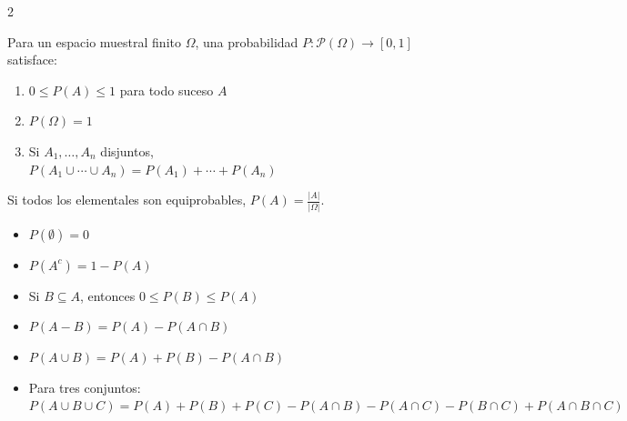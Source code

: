 \documentclass[10pt,a4paper]{article}
\begin{document}
\begin{multicols}{2}
    \begin{tcolorbox}[title=Definición, equal height group=PROB1]
        Para un espacio muestral finito \(\Omega\), una probabilidad \(P: \mathcal{P}(\Omega) \to [0,1]\) satisface:
        \begin{enumerate}[topsep=0pt]
            \item \(0 \leq P(A) \leq 1\) para todo suceso \(A\)
            \item \(P(\Omega) = 1\)
            \item Si \(A_1, \dots, A_n\) disjuntos, \\ \(P(A_1 \cup \cdots \cup A_n) = P(A_1) + \cdots + P(A_n)\)
        \end{enumerate}
        Si todos los elementales son equiprobables, \(P(A) = \frac{|A|}{|\Omega|}\).
    \end{tcolorbox}
    \begin{tcolorbox}[title=Propiedades, equal height group=PROB1]
        \begin{itemize}
            \item \(P(\emptyset) = 0\)
            \item \(P(A^c) = 1 - P(A)\)
            \item Si \(B \subseteq A\), entonces \(0 \leq P(B) \leq P(A)\)
            \item \(P(A - B) = P(A) - P(A \cap B)\)
            \item \(P(A \cup B) = P(A) + P(B) - P(A \cap B)\)
            \item Para tres conjuntos: \(P(A \cup B \cup C) = P(A) + P(B) + P(C) - P(A \cap B) - P(A \cap C) - P(B \cap C) + P(A \cap B \cap C)\)
        \end{itemize}
    \end{tcolorbox}
\end{multicols}
\end{document}
